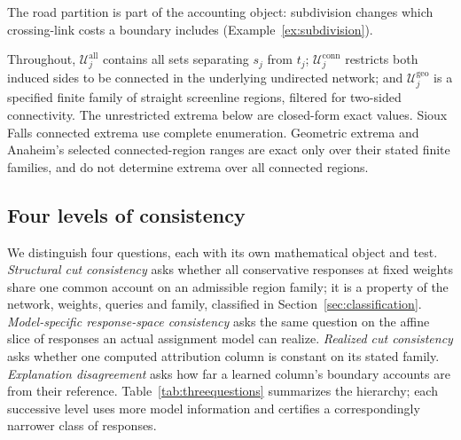 \documentclass[a4paper,fleqn]{cas-sc}
\begin{document}
The road partition is part of the accounting object: subdivision changes
which crossing-link costs a boundary includes (Example~\ref{ex:subdivision}).

Throughout, $\mathcal U_j^{\mathrm{all}}$ contains all sets separating
$s_j$ from $t_j$; $\mathcal U_j^{\mathrm{conn}}$ restricts both induced sides
to be connected in the underlying undirected network; and
$\mathcal U_j^{\mathrm{geo}}$ is a specified finite family of straight
screenline regions, filtered for two-sided connectivity.
The unrestricted extrema below are closed-form exact values. Sioux Falls
connected extrema use complete enumeration. Geometric extrema and Anaheim's
selected connected-region ranges are exact only over their stated finite
families, and do not determine extrema over all connected regions.

\subsection{Four levels of consistency}\label{sec:levels}\label{sec:hierarchy}
We distinguish four questions, each with its own mathematical object and
test. \emph{Structural cut consistency} asks whether all conservative
responses at fixed weights share one common account on an admissible
region family; it is a property of the network, weights, queries and
family, classified in Section~\ref{sec:classification}.
\emph{Model-specific response-space consistency} asks the same question
on the affine slice of responses an actual assignment model can
realize. \emph{Realized cut consistency} asks whether one computed
attribution column is constant on its stated family. \emph{Explanation
disagreement} asks how far a learned column's boundary accounts are
from their reference. Table~\ref{tab:threequestions} summarizes the
hierarchy; each successive level uses more model information and
certifies a correspondingly narrower class of responses.
\end{document}
